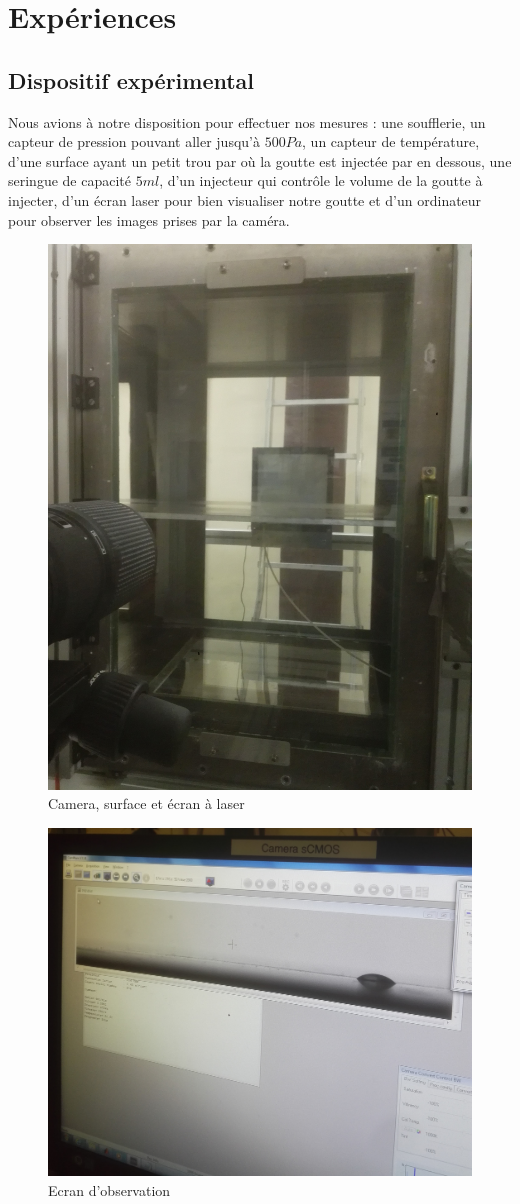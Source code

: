 \chapter{Expériences}\label{ch:experiences}
\section{Dispositif expérimental}

Nous avions à notre disposition pour effectuer nos mesures : une soufflerie, un capteur de pression pouvant aller jusqu'à $500Pa$, un capteur de température, d'une surface ayant un petit trou par où la goutte est injectée par en dessous, une seringue de capacité $5ml$, d'un injecteur qui contrôle le volume de la goutte à injecter, d'un écran laser pour bien visualiser notre goutte et d'un ordinateur pour observer les images prises par la caméra.

\begin{figure}[!hb]
\centering
	\includegraphics[width = 0.4\linewidth]{./gfx/Surface.jpg}
	\caption{Camera, surface et écran à laser}
	\label{fig:Plan}
\end{figure}
\begin{figure}[!hb]
\centering
	\includegraphics[width = 0.5\linewidth]{./gfx/Ecran.jpg}
	\caption{Ecran d'observation}
	\label{fig:Ecran d'observation}
\end{figure}


